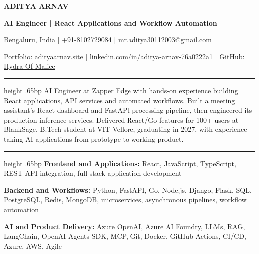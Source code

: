 \documentclass[10pt]{article}
\newcommand{\resumesection}[1]{\par\vspace{8bp}{\fontsize{11bp}{13bp}\selectfont\bfseries #1\par}\vspace{3bp}\hrule height .65bp\vspace{4bp}}
\begin{document}
\fontsize{10.25bp}{12.4bp}\selectfont
{\centering
{\fontsize{19bp}{22bp}\selectfont\bfseries ADITYA ARNAV\par}
\vspace{1bp}
{\fontsize{10.8bp}{13bp}\selectfont\bfseries AI Engineer | React Applications and Workflow Automation\par}
\vspace{2bp}
{\fontsize{9bp}{11bp}\selectfont Bengaluru, India | +91-8102729084 | \href{mailto:mr.aditya30112003@gmail.com}{mr.aditya30112003@gmail.com}\par}
{\fontsize{9bp}{11bp}\selectfont \href{https://www.adityaarnav.site/}{Portfolio: adityaarnav.site} | \href{https://www.linkedin.com/in/aditya-arnav-76a0222a1}{linkedin.com/in/aditya-arnav-76a0222a1} | \href{https://github.com/Hydra-Of-Malice}{GitHub: Hydra-Of-Malice}\par}}

\resumesection{SUMMARY}
AI Engineer at Zapper Edge with hands-on experience building React applications, API services and automated workflows. Built a meeting assistant's React dashboard and FastAPI processing pipeline, then engineered its production inference services. Delivered React/Go features for 100+ users at BlankSage. B.Tech student at VIT Vellore, graduating in 2027, with experience taking AI applications from prototype to working product.

\resumesection{TECHNICAL SKILLS}
\textbf{Frontend and Applications:} React, JavaScript, TypeScript, REST API integration, full-stack application development\par
\textbf{Backend and Workflows:} Python, FastAPI, Go, Node.js, Django, Flask, SQL, PostgreSQL, Redis, MongoDB, microservices, asynchronous pipelines, workflow automation\par
\textbf{AI and Product Delivery:} Azure OpenAI, Azure AI Foundry, LLMs, RAG, LangChain, OpenAI Agents SDK, MCP, Git, Docker, GitHub Actions, CI/CD, Azure, AWS, Agile
\end{document}
